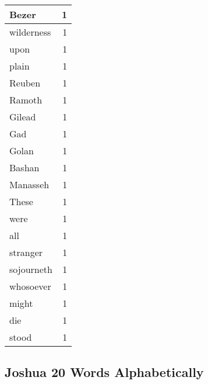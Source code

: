 \begin{center}
\begin{longtable}{l|r}
Bezer & 1\\ \hline 
wilderness & 1\\ \hline 
upon & 1\\ \hline 
plain & 1\\ \hline 
Reuben & 1\\ \hline 
Ramoth & 1\\ \hline 
Gilead & 1\\ \hline 
Gad & 1\\ \hline 
Golan & 1\\ \hline 
Bashan & 1\\ \hline 
Manasseh & 1\\ \hline 
These & 1\\ \hline 
were & 1\\ \hline 
all & 1\\ \hline 
stranger & 1\\ \hline 
sojourneth & 1\\ \hline 
whosoever & 1\\ \hline 
might & 1\\ \hline 
die & 1\\ \hline 
stood & 1\\ \hline 
\end{longtable}
\end{center}





\subsection{Joshua 20 Words Alphabetically}


\normalsize
 
